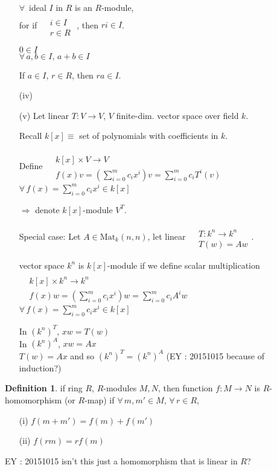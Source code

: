 \documentclass[twoside,landscape]{amsart}
\theoremstyle{plain}
\theoremstyle{definition}
\newtheorem{definition}{Definition}
\theoremstyle{remark}
\begin{document}
\begin{multicols*}{2}
\begin{enumerate}
$\forall \, $ ideal $I$ in $R$ is an $R$-module, \\
for if $\begin{aligned} & \quad \\
  & i \in I \\
  & r\in R \end{aligned}$ , then $ri \in I$.

$0\in I$ \\
$\forall \, a,b \in I, \, a+b \in I$


If $a\in I$, $r\in R$, then $ra \in I$.


\item[(iv)]
\item[(v)] Let linear $T:V \to V$, $V$ finite-dim. vector space over field $k$.  

Recall $k[x] \equiv $ set of polynomials with coefficients in $k$.  

Define $\begin{aligned} & \quad \\
  & k[x] \times V \to V \\
  & f(x)v =\left(\sum_{i=0}^m c_i x^i\right)v =\sum_{i=0}^m c_iT^i(v) \end{aligned}$ \quad \, $\forall \, f(x) = \sum_{i=0}^m c_ix^i \in k[x]$

$\Longrightarrow $ denote $k[x]$-module $V^T$.  

Special case: Let $A \in \text{Mat}_k(n,n)$, let linear $\begin{aligned} & \quad \\
  & T :k^n \to k^n \\
  & T(w) = Aw \end{aligned}$.  

vector space $k^n$ is $k[x]$-module if we define scalar multiplication $\begin{aligned} & \quad \\
  & k[x] \times k^n \to k^n \\
  & f(x)w = \left( \sum_{i=0}^m c_ix^i \right)w = \sum_{i=0}^m c_i A^i w \end{aligned}$ \quad \, $\forall \, f(x) = \sum_{i=0}^m c_ix^i \in k[x]$

In $(k^n)^T$, $xw = T(w)$ \\
In $(k^n)^A$, $xw = Ax $ \\
$T(w) = Ax$ and so $(k^n)^T = (k^n)^A$  (EY : 20151015 because of induction?)
\end{enumerate}

\begin{definition}
if ring $R$, $R$-modules $M,N$, then function $f:M\to N$ is $R$-homomorphism (or $R$-map) if $\forall \, m,m' \in M$, $\forall \, r \in R$, 
\begin{enumerate}
  \item[(i)] $f(m+m') = f(m)+f(m')$
  \item[(ii)] $f(rm)=rf(m)$
\end{enumerate}
\end{definition}
EY : 20151015 isn't this just a homomorphism that is linear in $R$? 


\end{multicols*}
\end{document}
